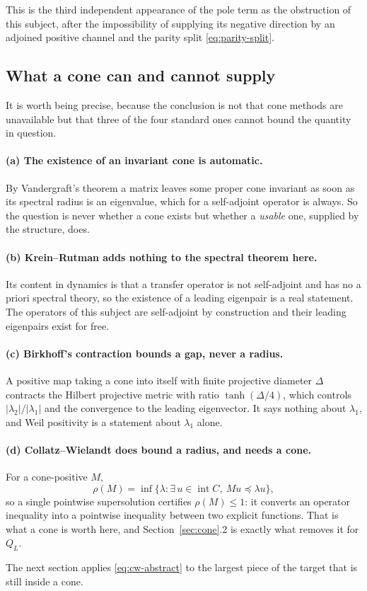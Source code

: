 This is the third independent appearance of the pole term as the obstruction of
this subject, after the impossibility of supplying its negative direction by an
adjoined positive channel and the parity split \eqref{eq:parity-split}.

\subsection{What a cone can and cannot supply}
It is worth being precise, because the conclusion is not that cone methods are
unavailable but that three of the four standard ones cannot bound the quantity
in question.

\paragraph{(a) The existence of an invariant cone is automatic.} By
Vandergraft's theorem a matrix leaves some proper cone invariant as soon as its
spectral radius is an eigenvalue, which for a self-adjoint operator is always.
So the question is never whether a cone exists but whether a \emph{usable} one,
supplied by the structure, does.

\paragraph{(b) Krein--Rutman adds nothing to the spectral theorem here.} Its
content in dynamics is that a transfer operator is not self-adjoint and has no a
priori spectral theory, so the existence of a leading eigenpair is a real
statement. The operators of this subject are self-adjoint by construction and
their leading eigenpairs exist for free.

\paragraph{(c) Birkhoff's contraction bounds a gap, never a radius.} A positive
map taking a cone into itself with finite projective diameter $\Delta$ contracts
the Hilbert projective metric with ratio $\tanh(\Delta/4)$, which controls
$|\lambda_2|/|\lambda_1|$ and the convergence to the leading eigenvector. It
says nothing about $\lambda_1$, and Weil positivity is a statement about
$\lambda_1$ alone.

\paragraph{(d) Collatz--Wielandt does bound a radius, and needs a cone.} For a
cone-positive $M$,
\begin{equation}\label{eq:cw-abstract}
 \rho(M)=\inf\{\lambda:\exists\,u\in\operatorname{int}C,\ Mu\preceq\lambda u\},
\end{equation}
so a single pointwise supersolution certifies $\rho(M)\leq1$: it converts an
operator inequality into a pointwise inequality between two explicit functions.
That is what a cone is worth here, and Section~\ref{sec:cone}.2 is exactly what removes
it for $Q_L$.

The next section applies \eqref{eq:cw-abstract} to the largest piece of the
target that is still inside a cone.
